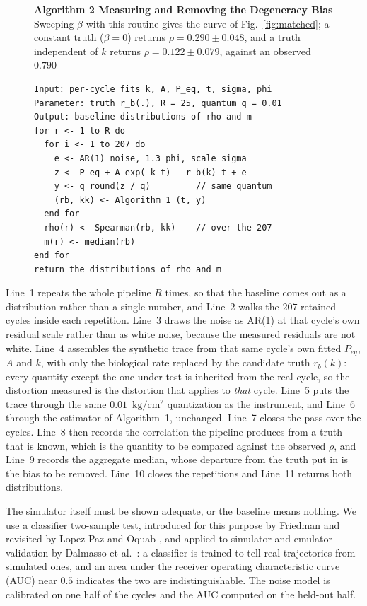 \documentclass[runningheads]{llncs}
\newcommand{\pu}{\ensuremath{\mathrm{kg/cm^{2}}}}
\newcommand{\rb}{\ensuremath{r_{b}}}
\begin{document}
\begin{figure}[t]
\noindent\textbf{Algorithm 2  Measuring and Removing the Degeneracy Bias} Sweeping
$\beta$ with this routine gives the curve of Fig.~\ref{fig:matched};
a constant truth ($\beta=0$) returns $\rho=0.290\pm0.048$, and a truth
independent of $k$ returns $\rho=0.122\pm0.079$, against an observed
$0.790$

\begin{verbatim}
Input: per-cycle fits k, A, P_eq, t, sigma, phi
Parameter: truth r_b(.), R = 25, quantum q = 0.01
Output: baseline distributions of rho and m
for r <- 1 to R do
  for i <- 1 to 207 do
    e <- AR(1) noise, 1.3 phi, scale sigma
    z <- P_eq + A exp(-k t) - r_b(k) t + e
    y <- q round(z / q)         // same quantum
    (rb, kk) <- Algorithm 1 (t, y)
  end for
  rho(r) <- Spearman(rb, kk)    // over the 207
  m(r) <- median(rb)
end for
return the distributions of rho and m
\end{verbatim}

\end{figure}

Line~1 repeats the whole
pipeline $R$ times, so that the baseline comes out as a distribution
rather than a single number, and Line~2 walks the $207$ retained
cycles inside each repetition. Line~3 draws the noise as AR(1) at
that cycle's own residual scale rather than as white noise, because
the measured residuals are not white. Line~4 assembles the synthetic
trace from that same cycle's own fitted $P_{eq}$, $A$ and $k$, with
only the biological rate replaced by the candidate truth $\rb(k)$:
every quantity except the one under test is inherited from the real
cycle, so the distortion measured is the distortion that applies to
\emph{that} cycle. Line~5 puts the trace through the same
$0.01$~\pu{} quantization as the instrument, and Line~6 through the
estimator of Algorithm~1, unchanged. Line~7 closes the pass over the
cycles. Line~8 then records the correlation the pipeline produces
from a truth that is known, which is the quantity to be compared
against the observed $\rho$, and Line~9 records the aggregate median,
whose departure from the truth put in is the bias to be removed.
Line~10 closes the repetitions and Line~11 returns both
distributions.

The simulator itself must be shown adequate, or the baseline means
nothing. We use a classifier two-sample test, introduced for this
purpose by Friedman \cite{friedman2003multivariate} and revisited by
Lopez-Paz and Oquab \cite{lopezpaz2017revisiting}, and applied to
simulator and emulator validation by Dalmasso et
al.~\cite{dalmasso2020validation}: a classifier is trained to tell real
trajectories from simulated ones, and an area under the receiver
operating characteristic curve (AUC) near $0.5$ indicates the
two are indistinguishable. The noise model is calibrated on one half of
the cycles and the AUC computed on the held-out half.
\end{document}
